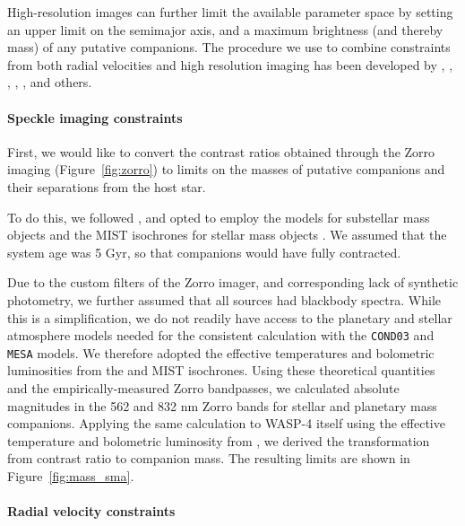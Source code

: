 \documentclass[12pt,twocolumn,tighten]{aastex62}
\begin{document}
High-resolution images can further limit the available parameter space
by setting an upper limit on the semimajor axis, and a maximum
brightness (and thereby mass) of any putative companions.  The
procedure we use to combine constraints from both radial velocities
and high resolution imaging has been developed by
\citet{wright_linear_trends_2007}, \citet{crepp_trends_2012},
\citet{montet_trends_2014}, \citet{knutson_friends_2014},
\citet{bryan_statistics_2016,bryan_excess_2019}, and others.

\paragraph{Speckle imaging constraints}

First, we would like to convert the contrast ratios obtained through
the Zorro imaging (Figure~\ref{fig:zorro}) to limits on the masses of
putative companions and their separations from the host star.

To do this, we followed \citet{montet_trends_2014}, and opted to
employ the \citet{baraffe_evolutionary_2003} models for substellar
mass objects and the MIST isochrones for stellar mass objects
\citep{paxton_modules_2011,paxton_modules_2013,paxton_modules_2015,dotter_mesa_2016,choi_mesa_2016}.
We assumed that the system age was 5 Gyr, so that companions would
have fully contracted.

Due to the custom filters of the Zorro imager, and corresponding lack
of synthetic photometry, we further assumed that all sources had
blackbody spectra. While this is a simplification, we do not
readily have access to the planetary and stellar atmosphere models
needed for the consistent calculation with the \texttt{COND03} and
\texttt{MESA} models.  We therefore adopted the effective temperatures
and bolometric luminosities from the \citet{baraffe_evolutionary_2003}
and MIST isochrones.  Using these theoretical quantities and the
empirically-measured Zorro bandpasses, we calculated absolute
magnitudes in the 562 and 832 nm Zorro bands for stellar and planetary
mass companions.  Applying the same calculation to WASP-4 itself using
the effective temperature and bolometric luminosity from
, we derived the transformation from
contrast ratio to companion mass.  The resulting limits are shown in
Figure~\ref{fig:mass_sma}.


\paragraph{Radial velocity constraints}
\end{document}
